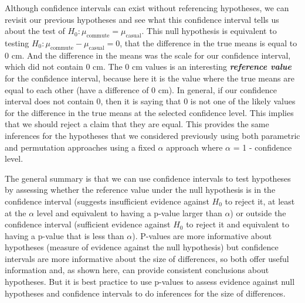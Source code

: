 \documentclass[
]{book}
\begin{document}
\indent Although confidence intervals can exist without referencing hypotheses,
we can
revisit our previous hypotheses and see what this confidence interval tells
us about the test of \(H_0: \mu_\text{commute} = \mu_\text{casual}\). This null
hypothesis is equivalent to testing \(H_0: \mu_\text{commute} - \mu_\text{casual} = 0\),
that the difference
in the true means is equal to 0 cm. And the difference in the means was the
scale for our confidence interval, which did not contain 0 cm. The
0 cm values is an interesting \textbf{\emph{reference value}} for the confidence interval, because
here it is the value where the true means are equal to each other (have a
difference of 0 cm). In general, if our confidence interval does not contain
0, then it is saying that 0 is not one of the likely values for the difference
in the true means at the selected confidence level. This implies that we should reject a claim that they are
equal. This provides the same inferences for the hypotheses that we considered
previously using both parametric and permutation approaches using a fixed \(\alpha\) approach where \(\alpha\) = 1 - confidence level.

\indent The general summary
is that we can use confidence intervals to test hypotheses by assessing whether
the reference value under the null hypothesis is in the confidence interval
(suggests insufficient evidence against \(H_0\) to reject it, at least at the \(\alpha\) level and equivalent to having a p-value larger than \(\alpha\)) or outside the confidence interval (sufficient evidence against \(H_0\) to reject it and equivalent to having a p-value that is less than \(\alpha\)). P-values
are more
informative about hypotheses (measure of evidence against the null hypothesis)
but confidence intervals are more informative
about the size of differences, so both offer useful information and, as shown
here, can provide consistent conclusions about hypotheses. But it is best practice to use p-values to assess evidence against null hypotheses and confidence intervals to do inferences for the size of differences.
\end{document}

